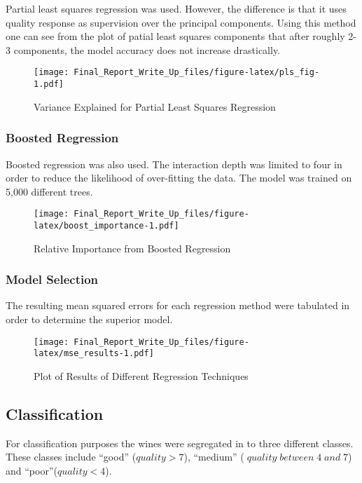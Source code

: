\documentclass[]{article}
\begin{document}
Partial least squares regression was used. However, the difference is
that it uses quality response as supervision over the principal
components. Using this method one can see from the plot of patial least
squares components that after roughly 2-3 components, the model accuracy
does not increase drastically.

\begin{figure}[htbp]
\centering
\texttt{[image: Final\_Report\_Write\_Up\_files/figure-latex/pls\_fig-1.pdf]}
\caption{Variance Explained for Partial Least Squares Regression}
\end{figure}

\subsubsection{Boosted Regression}\label{boosted-regression}

Boosted regression was also used. The interaction depth was limited to
four in order to reduce the likelihood of over-fitting the data. The
model was trained on 5,000 different trees.

\begin{figure}[H]
\centering
\texttt{[image: Final\_Report\_Write\_Up\_files/figure-latex/boost\_importance-1.pdf]}
\caption{Relative Importance from Boosted Regression}
\end{figure}

\subsubsection{Model Selection}\label{model-selection}

The resulting mean squared errors for each regression method were
tabulated in order to determine the superior model.

\begin{figure}[H]
\centering
\texttt{[image: Final\_Report\_Write\_Up\_files/figure-latex/mse\_results-1.pdf]}
\caption{Plot of Results of Different Regression Techniques}
\end{figure}

\subsection{Classification}\label{classification}

For classification purposes the wines were segregated in to three
different classes. These classes include ``good'' (\(quality >7\)),
``medium'' (\(\; quality \; between \; 4 \;and\; 7\)) and
``poor''(\(quality < 4\)).
\end{document}
